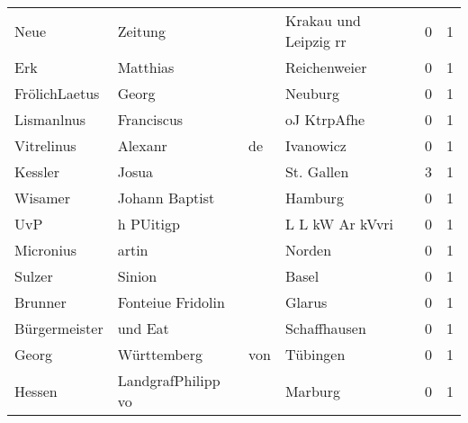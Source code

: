 \begin{center}
\begin{tiny}
\begin{longtabu}{llllrr}
                     Neue &                            Zeitung &             &                       Krakau und Leipzig rr &          0 &         1 \\
                      Erk &                           Matthias &             &                                Reichenweier &          0 &         1 \\
            FrölichLaetus &                              Georg &             &                                     Neuburg &          0 &         1 \\
               Lismanlnus &                         Franciscus &             &                                 oJ KtrpAfhe &          0 &         1 \\
               Vitrelinus &                            Alexanr &          de &                                   Ivanowicz &          0 &         1 \\
                  Kessler &                              Josua &             &                                  St. Gallen &          3 &         1 \\
                  Wisamer &                     Johann Baptist &             &                                     Hamburg &          0 &         1 \\
                      UvP &                          h PUitigp &             &                             L L kW Ar kVvri &          0 &         1 \\
                Micronius &                              artin &             &                                      Norden &          0 &         1 \\
                   Sulzer &                             Sinion &             &                                       Basel &          0 &         1 \\
                  Brunner &                  Fonteiue Fridolin &             &                                      Glarus &          0 &         1 \\
            Bürgermeister &                            und Eat &             &                                Schaffhausen &          0 &         1 \\
                    Georg &                        Württemberg &         von &                                    Tübingen &          0 &         1 \\
                   Hessen &                 LandgrafPhilipp vo &             &                                     Marburg &          0 &         1 \\

\end{longtabu}
\end{tiny}
\end{center}
